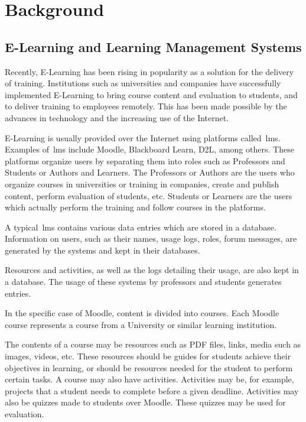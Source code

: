 \chapter{Background}
\label{sec:back}

\section{E-Learning and Learning Management Systems}
\label{sec:elearning_and_lms}

Recently, E-Learning has been rising in popularity as a solution for the
delivery of training. Institutions such as universities and companies have
successfully implemented E-Learning to bring course content and evaluation to
students, and to deliver training to employees remotely. This has been made
possible by the advances in technology and the increasing use of the Internet.

E-Learning is usually provided over the Internet using platforms
called~\gls{lms}. Examples of~\gls{lms} include Moodle, Blackboard Learn, D2L,
among others. These platforms organize users by separating them into roles such
as Professors and Students or Authors and Learners. The Professors or Authors
are the users who organize courses in universities or training in companies,
create and publish content, perform evaluation of students, etc. Students or
Learners are the users which actually perform the training and follow courses
in the platforms.

A typical~\gls{lms} contains various data entries which are stored in a
database. Information on users, such as their names, usage logs, roles, forum
messages, are generated by the systems and kept in their databases.

Resources and activities, as well as the logs detailing their usage, are also
kept in a database. The usage of these systems by professors and students
generates entries.~\cite{ind_010, ind_011, ind_013}

In the specific case of Moodle, content is divided into courses. Each Moodle
course represents a course from a University or similar learning institution.

The contents of a course may be resources such as PDF files, links, media such
as images, videos, etc. These resources should be guides for students achieve
their objectives in learning, or should be resources needed for the student to
perform certain tasks. A course may also have activities. Activities may be,
for example, projects that a student needs to complete before a given deadline.
Activities may also be quizzes made to students over Moodle. These quizzes may
be used for evaluation.

